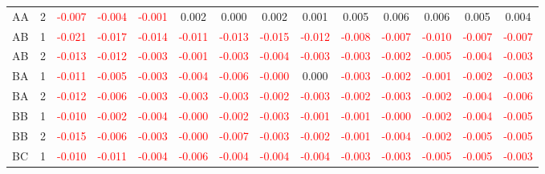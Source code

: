 \begin{table}[!htb]
{\begin{tabular}{llcccccccccccc}
AA & 2 & \textcolor{red}{-0.007} & \textcolor{red}{-0.004} & \textcolor{red}{-0.001} & 0.002 & 0.000 & 0.002 & 0.001 & 0.005 & 0.006 & 0.006 & 0.005 & 0.004\\
AB & 1 & \textcolor{red}{-0.021} & \textcolor{red}{-0.017} & \textcolor{red}{-0.014} & \textcolor{red}{-0.011} & \textcolor{red}{-0.013} & \textcolor{red}{-0.015} & \textcolor{red}{-0.012} & \textcolor{red}{-0.008} & \textcolor{red}{-0.007} & \textcolor{red}{-0.010} & \textcolor{red}{-0.007} & \textcolor{red}{-0.007}\\
AB & 2 & \textcolor{red}{-0.013} & \textcolor{red}{-0.012} & \textcolor{red}{-0.003} & \textcolor{red}{-0.001} & \textcolor{red}{-0.003} & \textcolor{red}{-0.004} & \textcolor{red}{-0.003} & \textcolor{red}{-0.003} & \textcolor{red}{-0.002} & \textcolor{red}{-0.005} & \textcolor{red}{-0.004} & \textcolor{red}{-0.003}\\
BA & 1 & \textcolor{red}{-0.011} & \textcolor{red}{-0.005} & \textcolor{red}{-0.003} & \textcolor{red}{-0.004} & \textcolor{red}{-0.006} & \textcolor{red}{-0.000} & 0.000 & \textcolor{red}{-0.003} & \textcolor{red}{-0.002} & \textcolor{red}{-0.001} & \textcolor{red}{-0.002} & \textcolor{red}{-0.003}\\
BA & 2 & \textcolor{red}{-0.012} & \textcolor{red}{-0.006} & \textcolor{red}{-0.003} & \textcolor{red}{-0.003} & \textcolor{red}{-0.003} & \textcolor{red}{-0.002} & \textcolor{red}{-0.003} & \textcolor{red}{-0.002} & \textcolor{red}{-0.003} & \textcolor{red}{-0.002} & \textcolor{red}{-0.004} & \textcolor{red}{-0.006}\\
BB & 1 & \textcolor{red}{-0.010} & \textcolor{red}{-0.002} & \textcolor{red}{-0.004} & \textcolor{red}{-0.000} & \textcolor{red}{-0.002} & \textcolor{red}{-0.003} & \textcolor{red}{-0.001} & \textcolor{red}{-0.001} & \textcolor{red}{-0.000} & \textcolor{red}{-0.002} & \textcolor{red}{-0.004} & \textcolor{red}{-0.005}\\
BB & 2 & \textcolor{red}{-0.015} & \textcolor{red}{-0.006} & \textcolor{red}{-0.003} & \textcolor{red}{-0.000} & \textcolor{red}{-0.007} & \textcolor{red}{-0.003} & \textcolor{red}{-0.002} & \textcolor{red}{-0.001} & \textcolor{red}{-0.004} & \textcolor{red}{-0.002} & \textcolor{red}{-0.005} & \textcolor{red}{-0.005}\\
BC & 1 & \textcolor{red}{-0.010} & \textcolor{red}{-0.011} & \textcolor{red}{-0.004} & \textcolor{red}{-0.006} & \textcolor{red}{-0.004} & \textcolor{red}{-0.004} & \textcolor{red}{-0.004} & \textcolor{red}{-0.003} & \textcolor{red}{-0.003} & \textcolor{red}{-0.005} & \textcolor{red}{-0.005} & \textcolor{red}{-0.003}\\

\end{tabular}}
\end{table}
